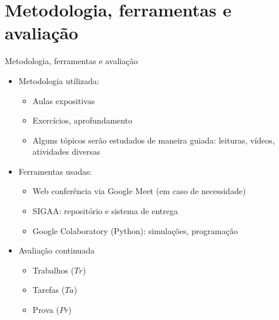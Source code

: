    \section[ slide = true]{Metodologia, ferramentas e avaliação}
      \begin{slide}[toc=]{Metodologia, ferramentas e avaliação}
         \begin{itemize}
		 \item Metodologia utilizada: %
		    \begin{itemize}
		            \item Aulas expositivas
			    \item Exercícios, aprofundamento
			    \item Alguns tópicos serão estudados de maneira guiada: leituras, vídeos, atividades diversas
		    \end{itemize}
	    \item Ferramentas usadas:
		    \begin{itemize}
			    \item Web conferência via Google Meet (em caso de necessidade)
			    \item SIGAA: repositório e sistema de entrega
			    \item Google Colaboratory (Python): simulações, programação 
		    \end{itemize}

            \item Avaliação continuada
            \begin{itemize}
		    \item Trabalhos ($Tr$) 
		    \item Tarefas ($Ta$)
		    \item Prova ($Pr$)
	    \end{itemize}
	  	 \end{itemize}
      \end{slide}
      
